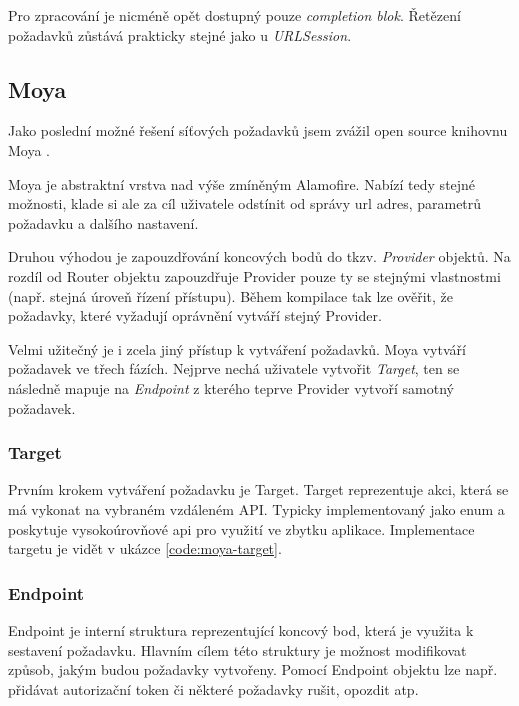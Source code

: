 Pro zpracování je nicméně opět dostupný pouze \textit{completion blok}.
Řetězení požadavků zůstává prakticky stejné jako u \textit{URLSession}.

\subsection{Moya}

Jako poslední možné řešení síťových požadavků jsem zvážil open source knihovnu Moya \cite{github-moya}.

Moya je abstraktní vrstva nad výše zmíněným Alamofire.
Nabízí tedy stejné možnosti, klade si ale za cíl uživatele odstínit od správy \acrshort{url} adres, parametrů požadavku a dalšího nastavení.

Druhou výhodou je zapouzdřování koncových bodů do tkzv. \textit{Provider} objektů.
Na rozdíl od Router objektu zapouzdřuje Provider pouze ty se stejnými vlastnostmi (např. stejná úroveň řízení přístupu).
Během kompilace tak lze ověřit, že požadavky, které vyžadují oprávnění vytváří stejný Provider.

\medskip

Velmi užitečný je i zcela jiný přístup k vytváření požadavků.
Moya vytváří požadavek ve třech fázích.
Nejprve nechá uživatele vytvořit \textit{Target}, ten se následně mapuje na \textit{Endpoint} z kterého teprve Provider vytvoří samotný požadavek.

\subsubsection*{Target}

Prvním krokem vytváření požadavku je Target.
Target reprezentuje akci, která se má vykonat na vybraném vzdáleném API.
Typicky implementovaný jako enum a poskytuje vysokoúrovňové \acrshort{api} pro využití ve zbytku aplikace.
Implementace targetu je vidět v ukázce \ref{code:moya-target}.


\subsubsection*{Endpoint}

Endpoint je interní struktura reprezentující koncový bod, která je využita k sestavení požadavku.
Hlavním cílem této struktury je možnost modifikovat způsob, jakým budou požadavky vytvořeny.
Pomocí Endpoint objektu lze např. přidávat autorizační token či některé požadavky rušit, opozdit atp.

